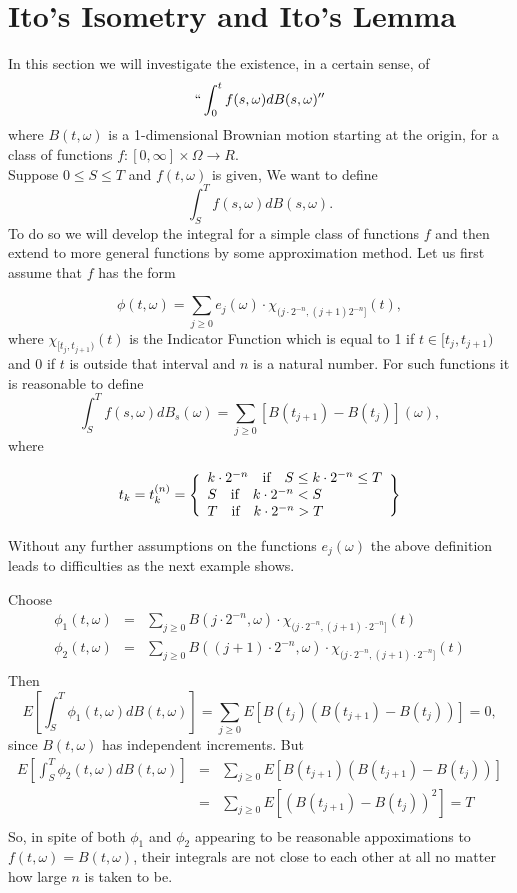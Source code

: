 \section{Ito's Isometry and Ito's Lemma}

In this section we will investigate the existence, in a certain sense, of $$``\int_0^t f(s,\omega) dB(s,\omega)''$$ where $B(t, \omega)$ is a 1-dimensional Brownian motion starting at the origin, for a class of functions $f: [0,\infty] \times \Omega \rightarrow R$.\\

Suppose $0\le S \le T$ and $f(t,\omega)$ is given, We want to define $$\int_S^T f(s,\omega) dB(s,\omega).$$ To do so we will develop the integral for a simple class of functions $f$ and then extend to more general functions by some approximation method. Let us first assume that $f$ has the form

$$\phi(t,\omega) = \sum_{j\ge0} e_j(\omega)\cdot \chi_{(j\cdot2^{-n}, (j+1)2^{-n}]} (t),$$ where $\chi_{[t_j, t_{j+1} ) } (t)$ is the Indicator Function which is equal to 1 if $t\in [t_j, t_{j+1})$ and 0 if $t$ is outside that interval and $n$ is a natural number. For such functions it is reasonable to define $$\int_S^T f(s,\omega) dB_s(\omega) = \sum_{j\ge0}[B(t_{j+1}) - B(t_j)](\omega),$$ where 

$$t_k = t_k^{(n)} =
\Bigg\{ 
\begin{array}{l}
k\cdot2^{-n}\quad \hbox{if} \quad S \le k\cdot 2^{-n} \le T\\
S \quad \hbox{if} \quad k\cdot2^{-n} < S \\
T \quad \hbox{if} \quad k\cdot2^{-n} > T
\end{array}
\Bigg\}$$

Without any further assumptions on the functions $e_j(\omega)$ the above definition leads to difficulties as the next example shows.
\begin{example}
Choose
\begin{eqnarray*}
\phi_1(t,\omega) &=& \sum_{j\ge0} B(j\cdot2^{-n},\omega)\cdot \chi_{(j\cdot2^{-n}, (j+1)\cdot2^{-n}]} (t) \\
\phi_2(t,\omega) &=& \sum_{j\ge0} B((j+1)\cdot2^{-n},\omega)\cdot \chi_{(j\cdot2^{-n}, (j+1)\cdot2^{-n}]} (t) \\
\end{eqnarray*}
Then $$E[\int_S^T \phi_1(t,\omega) dB(t,\omega)] = \sum_{j\ge0} E[B(t_j)(B(t_{j+1}) - B(t_j))] = 0,$$ since $B(t,\omega)$ has independent increments. But
\begin{eqnarray*}
E[\int_S^T \phi_2(t,\omega) dB(t,\omega)] &=& \sum_{j\ge0} E[B(t_{j+1})(B(t_{j+1}) - B(t_j))] \\
&=& \sum_{j\ge0} E[(B(t_{j+1}) - B(t_j))^2]  = T\\
\end{eqnarray*}
So, in spite of both $\phi_1$ and $\phi_2$ appearing to be reasonable appoximations to $f(t,\omega) = B(t,\omega)$, their integrals are not close to each other at all no matter how 
large $n$ is taken to be. 
\end{example}

